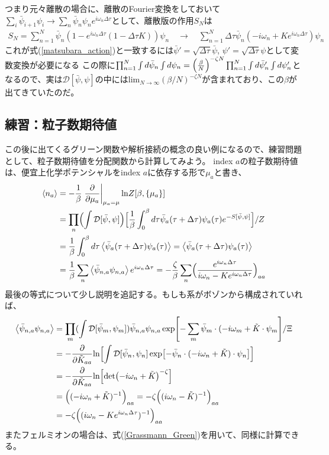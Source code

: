 \documentclass[a4paper,12pt]{jsarticle}
\newcommand{\p}{\partial}
\begin{document}
つまり元々離散の場合に、離散のFourier変換をしておいて$\sum_i \bar\psi_{i+1}\psi_i \rightarrow \sum_n \bar\psi_{n}\psi_n e^{i\omega_n\Delta\tau}$として、離散版の作用$S_N$は
\begin{align}
  S_N = \sum_{n=1}^N \bar\psi_n(1 - e^{i\omega_n\Delta\tau}(1-\Delta\tau K))\psi_n \quad \rightarrow \quad  \sum_{n=1}^N \Delta\tau\bar\psi_n(-i\omega_n+Ke^{i\omega_n\Delta\tau})\psi_n
\end{align}
これが式(\ref{matsubara_action})と一致するには$\bar\psi' = \sqrt{\Delta\tau}\bar\psi$, $\psi' = \sqrt{\Delta\tau}\psi$として変数変換が必要になる
この際に$\prod_{n=1}^N\int d\bar\psi_n \int d\psi_n = \Bigl(\frac{\beta}{N}\Bigr)^{-\zeta N}\prod_{n=1}^N\int d\bar\psi'_n \int d\psi'_n$となるので、実は$\mathcal{D}[\bar\psi, \psi]$の中には$\mathrm{lim}_{N\rightarrow\infty}(\beta/N)^{-\zeta N}$が含まれており、この$\beta$が出てきていたのだ。

\subsection{練習：粒子数期待値}
この後に出てくるグリーン関数や解析接続の概念の良い例になるので、練習問題として、粒子数期待値を分配関数から計算してみよう。
index $a$の粒子数期待値は、便宜上化学ポテンシャルをindex $a$に依存する形で$\mu_a$と書き、
\begin{align}
  \ev{n_a} &= -\frac{1}{\beta}\left.\frac{\p}{\p\mu_a}\right|_{\mu_a=\mu}\mathrm{ln}Z[\beta, \{\mu_a\}] \\
  &= \prod_n\Bigl(\int\mathcal D[\bar\psi,\psi]\Bigr)\Bigl[\frac{1}{\beta}\int_0^\beta d\tau \bar\psi_a(\tau+\Delta\tau)\psi_a(\tau) e^{-S[\bar\psi, \psi]}\Bigr]/Z\\
  &= \frac{1}{\beta}\int_0^\beta d\tau\ev{\bar\psi_a(\tau+\Delta\tau)\psi_a(\tau)} = \ev{\bar\psi_a(\tau+\Delta\tau)\psi_a(\tau)}\\
  &= \frac{1}{\beta}\sum_n \ev{\bar{\psi}_{n,a}\psi_{n,a}}e^{i\omega_n\Delta\tau} = -\frac{\zeta}{\beta}\sum_n\Bigl(\frac{e^{i\omega_n\Delta\tau}}{i\omega_n - Ke^{i\omega_n\Delta\tau}}\Bigr)_{aa}\label{Matsubara_nev}
\end{align}
最後の等式について少し説明を追記する。もしも系がボゾンから構成されていれば、
\begin{align}
  \ev{\bar\psi_{n,a}\psi_{n,a}} &= \prod_m(\int \mathcal{D}[\bar\psi_m, \psi_m]) \bar\psi_{n,a}\psi_{n,a} \exp[-\sum_m\bar\psi_m\cdot(-i\omega_m + \tilde{K}\cdot\psi_m]/\Xi\\
  &= -\frac{\p}{\p \tilde{K}_{aa}}\mathrm{ln}\Bigl[\int\mathcal{D}[\bar\psi_n, \psi_n]\exp[-\bar\psi_n\cdot(-i\omega_n + \tilde{K})\cdot\psi_n]\Bigr]\\
  &=-\frac{\p}{\p \tilde{K}_{aa}}\mathrm{ln}\Bigl[\det(-i\omega_n + \tilde{K})^{-\zeta}\Bigr]\\
  &= \Bigl((-i\omega_n + \tilde{K})^{-1}\Bigr)_{aa} = -\zeta\Bigl((i\omega_n - \tilde{K})^{-1}\Bigr)_{aa}\\
  &= -\zeta\Bigl((i\omega_n - Ke^{i\omega_n\Delta\tau})^{-1}\Bigr)_{aa}
\end{align}
またフェルミオンの場合は、式(\ref{Grassmann_Green})を用いて、同様に計算できる。
\end{document}
